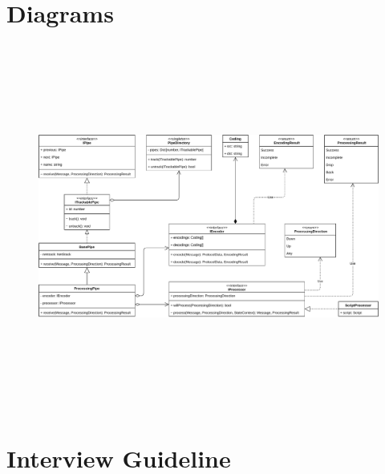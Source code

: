 \chapter{Diagrams}

\begin{figure}
    \centering
    \includegraphics[height=12cm]{img/ch05/classes-2-pipes.pdf}
    \label{fig:app-classes-2-pipes}
\end{figure}

\chapter{Interview Guideline}
\label{txt:app-interview-guideline}

